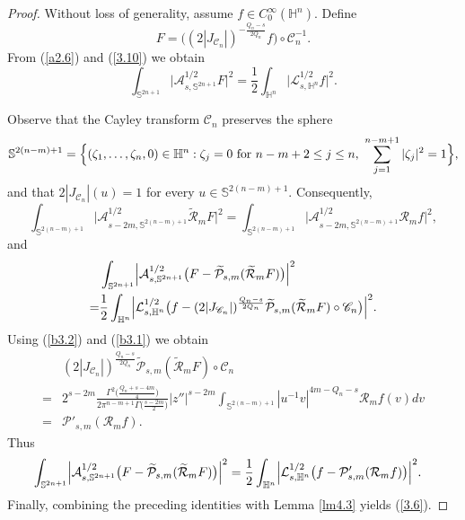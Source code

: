 \documentclass[12pt,reqno]{amsart}%
\theoremstyle{plain}
\numberwithin{equation}{section}
\begin{document}
\begin{proof}
Without loss of generality, assume \(f \in C_{0}^{\infty}(\mathbb{H}^{n})\).
Define
\[
F = \bigl( (2|J_{\mathscr{C}_{n}}|)^{-\frac{Q_n-s}{2Q_n}} f \bigr)\circ\mathscr{C}_{n}^{-1}.
\]
From (\ref{a2.6}) and (\ref{3.10}) we obtain
\[
\int_{\mathbb{S}^{2n+1}} \bigl|\mathcal{A}_{s,\mathbb{S}^{2n+1}}^{1/2} F\bigr|^{2}
= \frac{1}{2}\int_{\mathbb{H}^{n}} \bigl|\mathcal{L}_{s,\mathbb{H}^{n}}^{1/2} f\bigr|^{2}.
\]

Observe that the Cayley transform \(\mathscr{C}_{n}\) preserves the sphere
\[
\mathbb{S}^{2(n-m)+1} = \Bigl\{(\zeta_{1},\dots,\zeta_{n}, 0)\in \mathbb{H}^{n} :
\zeta_{j}=0 \text{ for } n-m+2 \leq j \leq n,\
\sum_{j=1}^{n-m+1}|\zeta_{j}|^{2}=1 \Bigr\},
\]
and that \(2|J_{\mathscr{C}_{n}}|(u)=1\) for every \(u \in \mathbb{S}^{2(n-m)+1}\). Consequently,
\[
\int_{\mathbb{S}^{2(n-m)+1}} \bigl|\mathcal{A}_{s-2m,\mathbb{S}^{2(n-m)+1}}^{1/2}
\widetilde{\mathcal{R}}_{m}F\bigr|^{2}
= \int_{\mathbb{S}^{2(n-m)+1}} \bigl|\mathcal{A}_{s-2m,\mathbb{S}^{2(n-m)+1}}^{1/2}
\mathcal{R}_{m}f\bigr|^{2},
\]
and
\begin{align*}
&\int_{\mathbb{S}^{2n+1}} \Bigl|\mathcal{A}_{s,\mathbb{S}^{2n+1}}^{1/2}\bigl(F-
\widetilde{\mathcal{P}}_{s,m}(\widetilde{\mathcal{R}}_{m}F)\bigr)\Bigr|^{2}\\
=& \frac{1}{2}
\int_{\mathbb{H}^{n}} \Bigl|\mathcal{L}_{s,\mathbb{H}^{n}}^{1/2}\bigl(f - (2|J_{\mathscr{C}_{n}}|)^{\frac{Q_n-s}{2Q_n}}\widetilde{\mathcal{P}}_{s,m}(\widetilde{\mathcal{R}}_{m}F)\circ\mathscr{C}_n\bigr)\Bigr|^{2}.
\end{align*}
Using (\ref{b3.2}) and (\ref{b3.1}) we obtain
\begin{align*}
&(2|J_{\mathscr{C}_{n}}|)^{\frac{Q_n-s}{2Q_n}}\widetilde{\mathcal{P}}_{s,m}(\widetilde{\mathcal{R}}_{m}F)\circ\mathscr{C}_n \\
=& 2^{s-2m}
\frac{\Gamma^{2}\bigl(\frac{Q_n+s-4m}{4}\bigr)}
{2\pi^{n-m+1}\Gamma\bigl(\frac{s-2m}{2}\bigr)}
|z''|^{s-2m}\int_{\mathbb{S}^{2(n-m)+1}} |u^{-1}v|^{4m-Q_n-s}\mathcal{R}_{m}f(v)dv \\
=& \mathcal{P}'_{s,m}(\mathcal{R}_{m}f).
\end{align*}
Thus
\begin{align*}
&\int_{\mathbb{S}^{2n+1}} \Bigl|\mathcal{A}_{s,\mathbb{S}^{2n+1}}^{1/2}\bigl(F-
\widetilde{\mathcal{P}}_{s,m}(\widetilde{\mathcal{R}}_{m}F)\bigr)\Bigr|^{2}= \frac{1}{2}
\int_{\mathbb{H}^{n}} \Bigl|\mathcal{L}_{s,\mathbb{H}^{n}}^{1/2}\bigl(f - \mathcal{P}'_{s,m}(\mathcal{R}_{m}f)\bigr)\Bigr|^{2}.
\end{align*}
Finally, combining the preceding identities with Lemma \ref{lm4.3} yields (\ref{3.6}).
\end{proof}
\end{document}

